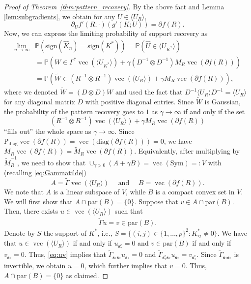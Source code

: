 \documentclass[12pt]{amsart}
\numberwithin{equation}{section}
\numberwithin{equation}{section}
\theoremstyle{plain}
\theoremstyle{definition}
\newcommand{\diag}[1]{\mathrm{diag}(#1)}
\newcommand{\Sym}{\mathrm{Sym}}
\newcommand{\sign}{\mathrm{sign}}
\newcommand{\Supp}{\mathbf{s}_\ast}
\begin{document}
\begin{proof}[Proof of Theorem~\ref{thm:pattern_recovery}]
By the above fact and Lemma \ref{lem:subgradients}, we obtain for any $U\in\langle U_{R}\rangle$, 
\[
\partial_U f'(R;\cdot)(g'(K;U)) = \partial f(R).
\]
Now, we can express the limiting probability of support recovery as
\begin{align}\label{limiting probability in proof}
\lim_{n\rightarrow \infty}&\mathbb{P}\left(\sign(\hat{K}_n)=\sign(K^\ast)\right) =\mathbb{P}\left( \hat{U}\in\langle U_{K^\ast}\rangle\right)\nonumber \\ &=\mathbb{P} \left(W \in \Gamma^\ast\operatorname{vec}(\langle U_{K^\ast}\rangle) + \gamma(D^{-1}\otimes D^{-1})M_R   \operatorname{vec}(\partial f( R))\right)\nonumber\\
&=\mathbb{P} \left(\tilde{W} \in (R^{-1}\otimes R^{-1})\operatorname{vec}(\langle U_R\rangle) +\gamma M_R \operatorname{vec}(\partial f(R))\right),
\end{align}
where we denoted $\tilde{W}=(D\otimes D)W$ and used the fact that $D^{-1}\langle U_R\rangle D^{-1}=\langle U_R\rangle$ for any diagonal matrix $D$ with positive diagonal entries. 
Since $\tilde{W}$ is Gaussian, the probability of the pattern recovery goes to $1$ as $\gamma\to\infty$ if and only if the set 
\[
(R^{-1}\otimes R^{-1})\operatorname{vec}(\langle U_R\rangle) +\gamma M_R \operatorname{vec}(\partial f(R))
\]``fills out'' the whole space as $\gamma\to\infty$. Since $\mathrm{P}_{\mathrm{diag}} \operatorname{vec}(\partial f(R)) = \operatorname{vec}(\diag{\partial f(R)})=0$, we have $M_R \operatorname{vec}(\partial f(R))=\tilde{M}_R \operatorname{vec}(\partial f(R))$. Equivalently, after multiplying by $\tilde{M}_R^{-1}$, we need to show that $\cup_{\gamma>0}( A+\gamma B)=\operatorname{vec}(\Sym)=:V$ with (recalling \eqref{eq:Gammatilde})
\[
A = \tilde{\Gamma}\operatorname{vec}(\langle U_R\rangle)\quad\mbox{ and }\quad B=\operatorname{vec}(\partial f(R)).
\]
We note that $A$ is a linear subspace of $V$, while $B$ is a compact convex set in $V$. 
We will first show that $A\cap\mathrm{par}(B)=\{0\}$. Suppose that $v\in A\cap\mathrm{par}(B)$. Then, there exists $u\in \operatorname{vec}(\langle U_R\rangle)$ such that 
\begin{align}\label{eq:uv}
\tilde{\Gamma} u = v \in \mathrm{par}(B).
\end{align}
Denote by $S$ the support of $K^\ast$, i.e., $S=\{(i,j)\in \{1,\ldots,p\}^2\colon  K^\ast_{ij}\neq 0\}$.
We have that $u\in \operatorname{vec}(\langle U_R\rangle)$ if and only if $u_{\Supp^c}=0$ and $v \in \mathrm{par}(B)$ if and only if $v_{\Supp}=0$. Thus, \eqref{eq:uv} implies that 
$\tilde\Gamma_{\Supp\Supp} u_{\Supp} =0$ and $\tilde\Gamma_{\Supp^c\Supp} u_{\Supp} = v_{\Supp^c}$.  
Since $\tilde\Gamma_{\Supp\Supp}$ is invertible, we obtain $u=0$, which further implies that $v=0$. Thus, $A\cap\mathrm{par}(B)=\{0\}$ as claimed. 


\end{proof}
\end{document}
